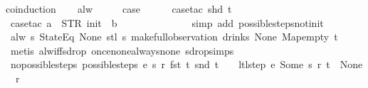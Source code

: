 \begin{isabellebody}
%
\isadelimproof
%
\endisadelimproof
%
\isatagproof
{}\isamarkupfalse%
{\isacharparenleft}coinduction{\isacharparenright}\isanewline
\ \ \isamarkupfalse%
\ alw\isanewline
\ \ \isamarkupfalse%
\ \isamarkupfalse%
\ {\isacharquery}case\isanewline
\ \ \ \ \isamarkupfalse%
\ {\isacharparenleft}case{\isacharunderscore}tac\ {\isachardoublequoteopen}shd\ t{\isachardoublequoteclose}{\isacharparenright}\isanewline
\ \ \ \ \isamarkupfalse%
\ {\isacharparenleft}case{\isacharunderscore}tac\ {\isachardoublequoteopen}a\ {\isacharequal}\ STR\ {\isacharprime}{\isacharprime}init{\isacharprime}{\isacharprime}\ {\isasymand}\ b\ {\isacharequal}\ {\isacharbrackleft}{\isacharbrackright}{\isachardoublequoteclose}{\isacharparenright}\isanewline
\ \ \ \ \ \isamarkupfalse%
\isanewline
\ \ \ \ \ \isamarkupfalse%
\ {\isacharparenleft}simp\ add{\isacharcolon}\ possible{\isacharunderscore}steps{\isacharunderscore}not{\isacharunderscore}init{\isacharparenright}\isanewline
\ \ \ \ \isamarkupfalse%
%
\endisatagproof
{\isafoldproof}%
%
\isadelimproof
\isanewline
%
\endisadelimproof
\isanewline
\isanewline
{}\isamarkupfalse%
\ {\isachardoublequoteopen}alw\ {\isacharparenleft}{\isasymlambda}s{\isachardot}\ StateEq\ None\ {\isacharparenleft}stl\ s{\isacharparenright}{\isacharparenright}\ {\isacharparenleft}make{\isacharunderscore}full{\isacharunderscore}observation\ drinks\ None\ Map{\isachardot}empty\ t{\isacharparenright}{\isachardoublequoteclose}\isanewline
%
\isadelimproof
\ \ %
\endisadelimproof
%
\isatagproof
{}\isamarkupfalse%
\ {\isacharparenleft}metis\ alw{\isacharunderscore}iff{\isacharunderscore}sdrop\ once{\isacharunderscore}none{\isacharunderscore}always{\isacharunderscore}none\ sdrop{\isacharunderscore}simps{\isacharparenleft}{}{\isacharparenright}{\isacharparenright}%
\endisatagproof
{\isafoldproof}%
%
\isadelimproof
\isanewline
%
\endisadelimproof
\isanewline
{}\isamarkupfalse%
\ no{\isacharunderscore}possible{\isacharunderscore}steps{\isacharcolon}\ {\isachardoublequoteopen}possible{\isacharunderscore}steps\ e\ s\ r\ {\isacharparenleft}fst\ t{\isacharparenright}\ {\isacharparenleft}snd\ t{\isacharparenright}\ {\isacharequal}\ {\isacharbraceleft}{\isacharbar}{\isacharbar}{\isacharbraceright}\ {\isasymLongrightarrow}\ ltl{\isacharunderscore}step\ e\ {\isacharparenleft}Some\ s{\isacharparenright}\ r\ t\ {\isacharequal}\ {\isacharparenleft}None{\isacharcomma}\ {\isacharbrackleft}{\isacharbrackright}{\isacharcomma}\ r{\isacharparenright}{\isachardoublequoteclose}\isanewline

\end{isabellebody}
